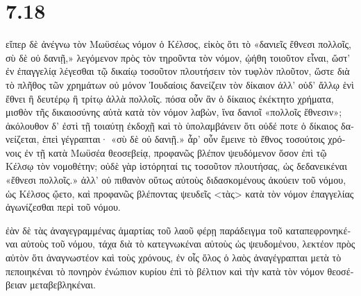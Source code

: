\section*{7.18}

\begin{greek}
\raggedright

εἴπερ δὲ ἀνέγνω τὸν Μωϋσέως νόμον ὁ Κέλσος, εἰκὸς ὅτι τὸ «δανιεῖς ἔθνεσι πολλοῖς, σὺ δὲ οὐ δανιῇ,» λεγόμενον πρὸς τὸν τηροῦντα τὸν νόμον, ᾠήθη τοιοῦτον εἶναι, ὥστ' ἐν ἐπαγγελίᾳ λέγεσθαι τῷ δικαίῳ τοσοῦτον πλουτήσειν τὸν τυφλὸν πλοῦτον, ὥστε διὰ τὸ πλῆθος τῶν χρημάτων οὐ μόνον Ἰουδαίοις δανείζειν τὸν δίκαιον ἀλλ' οὐδ' ἄλλῳ ἑνὶ ἔθνει ἢ δευτέρῳ ἢ τρίτῳ ἀλλὰ πολλοῖς. πόσα οὖν ἂν ὁ δίκαιος ἐκέκτητο χρήματα, μισθὸν τῆς δικαιοσύνης αὐτὰ κατὰ τὸν νόμον λαβὼν, ἵνα δανιοῖ «πολλοῖς ἔθνεσιν»; ἀκόλουθον δ' ἐστὶ τῇ τοιαύτῃ ἐκδοχῇ καὶ τὸ ὑπολαμβάνειν ὅτι οὐδέ ποτε ὁ δίκαιος δανείζεται, ἐπεὶ γέγραπται· «σὺ δὲ οὐ δανιῇ.» ἆρ' οὖν ἔμεινε τὸ ἔθνος τοσούτοις χρόνοις ἐν τῇ κατὰ Μωϋσέα θεοσεβείᾳ, προφανῶς βλέπον ψευδόμενον ὅσον ἐπὶ τῷ Κέλσῳ τὸν νομοθέτην; οὐδὲ γὰρ ἱστόρηταί τις τοσοῦτον πλουτήσας, ὡς δεδανεικέναι «ἔθνεσι πολλοῖς.» ἀλλ' οὐ πιθανὸν οὕτως αὐτοὺς διδασκομένους ἀκούειν τοῦ νόμου, ὡς Κέλσος ᾤετο, καὶ προφανῶς βλέποντας ψευδεῖς <τὰς> κατὰ τὸν νόμον ἐπαγγελίας ἀγωνίζεσθαι περὶ τοῦ νόμου.

ἐὰν δὲ τὰς ἀναγεγραμμένας ἁμαρτίας τοῦ λαοῦ φέρῃ παράδειγμα τοῦ καταπεφρονηκέναι αὐτοὺς τοῦ νόμου, τάχα διὰ τὸ κατεγνωκέναι αὐτοὺς ὡς ψευδομένου, λεκτέον πρὸς αὐτὸν ὅτι ἀναγνωστέον καὶ τοὺς χρόνους, ἐν οἷς ὅλος ὁ λαὸς ἀναγέγραπται μετὰ τὸ πεποιηκέναι τὸ πονηρὸν ἐνώπιον κυρίου ἐπὶ τὸ βέλτιον καὶ τὴν κατὰ τὸν νόμον θεοσέβειαν μεταβεβληκέναι.

\end{greek}